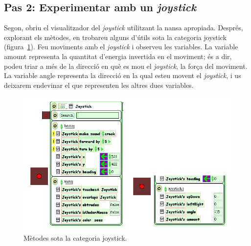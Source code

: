 \subsection{Pas 2: Experimentar amb un \emph{joystick}}
Segon, obriu el visualitzador del \emph{joystick} utilitzant la nansa apropiada. Després, explorant els mètodes, en trobareu alguns d'útils sota la categoria \textsf{joystick} (figura~\ref{fig2416}). Feu moviments amb el \emph{joystick} i observeu les variables. La variable \textsf{amount} representa la quantitat d'energia invertida en el moviment; és a dir, podeu triar a més de la direcció en què es mou el \emph{joystick}, la força del moviment. La variable \textsf{angle} representa la direcció en la qual esteu movent el \emph{joystick}, i us deixarem endevinar el que representen les altres dues variables.
\begin{figure}[h!]
\begin{center}
\includegraphics[scale=2]{Imatges/figura24-16}
\end{center}
\caption{Mètodes sota la categoria \textsf{\upshape joystick}.}
\label{fig2416}
\end{figure}

